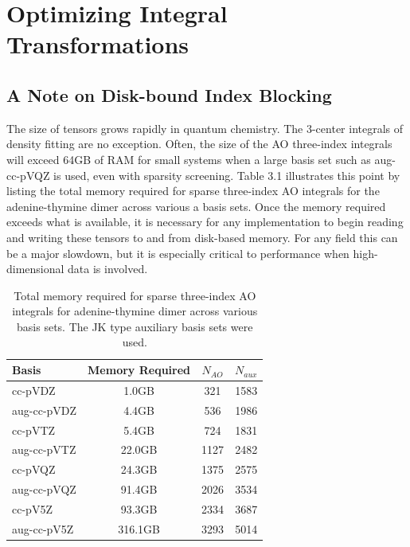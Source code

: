 \chapter{Optimizing Integral Transformations}

\section{A Note on Disk-bound Index Blocking}

The size of tensors grows rapidly in quantum chemistry. The 3-center integrals of density fitting are no exception.
Often, the size of the AO three-index integrals will exceed 64GB of RAM for small systems when
a large basis set such as aug-cc-pVQZ is used, even with sparsity screening. Table 3.1 illustrates this point by listing
the total memory required for sparse three-index AO integrals for the adenine-thymine dimer across various a basis sets. Once the memory required
exceeds what is available, it is necessary for
any implementation to begin reading and writing these tensors to and from disk-based memory. For any field this can
be a major slowdown, but it is especially critical to performance when high-dimensional data is involved. 

\begingroup
\begin{table}[H]
\centering
\renewcommand{\baselinestretch}{1}
\caption{Total memory required for sparse three-index AO integrals for adenine-thymine dimer across various basis sets.
The JK type auxiliary basis sets were used.}
\begin{tabular}{l ccc}
\multicolumn{1}{l}{\textbf{Basis}} &
\multicolumn{1}{c}{\textbf{Memory Required}} &
\multicolumn{1}{c}{\textbf{$N_{AO}$}} &
\multicolumn{1}{c}{\textbf{$N_{aux}$}} \\
\hline

   cc-pVDZ   &      1.0GB    &    321   &     1583\\
aug-cc-pVDZ  &      4.4GB   &     536  &     1986\\
   cc-pVTZ   &      5.4GB    &    724   &     1831\\
aug-cc-pVTZ  &     22.0GB   &    1127  &     2482\\
   cc-pVQZ   &     24.3GB    &   1375   &     2575\\
aug-cc-pVQZ  &     91.4GB   &    2026  &     3534\\
   cc-pV5Z   &     93.3GB    &   2334   &     3687\\
aug-cc-pV5Z  &    316.1GB   &    3293  &     5014\\ 

\end{tabular}
\end{table}
\endgroup

